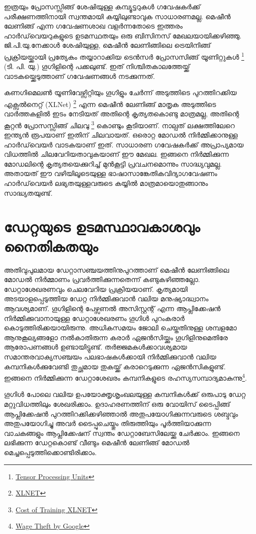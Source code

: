 \documentclass[12pt,twoside,a4paper]{article}
\begin{document}
ഇത്രയും പ്രോസസ്സിങ്ങ് ശേഷിയുള്ള കമ്പ്യൂട്ടറുകൾ ഗവേഷകർക്ക് പരീക്ഷണത്തിനായി സ്വന്തമായി കയ്യിലുണ്ടാവുക സാധാരണമല്ല. മെഷീൻ ലേണിങ്ങ് എന്ന ഗവേഷണശാഖ വളർന്നതോടെ ഇത്തരം ഹാർഡ്‌വെയറുകളുടെ ഉടമസ്ഥതയും ഒരു ബിസിനസ് മേഖലയായിക്കഴിഞ്ഞു. ജി.പി.യു.നേക്കാൾ ശേഷിയുള്ള, മെഷീൻ ലേണിങ്ങിലെ ട്രെയിനിങ്ങ് പ്രക്രിയയ്ക്കായി പ്രത്യേകം തയ്യാറാക്കിയ ടെൻസർ പ്രോസസിങ്ങ് യൂണിറ്റുകൾ \footnote{ \href{https://cloud.google.com/tpu/}{Tensor Processing Units} } (ടി. പി. യു.) ഗൂഗിളിന്റെ പക്കലുണ്ട്. ഇത് നിശ്ചിതകാലത്തേയ്ക്ക് വാടകയ്ക്കെടുത്താണ് ഗവേഷണങ്ങൾ നടക്കുന്നത്. 

കണഗിമെലൺ യൂണിവേഴ്സിറ്റിയും ഗൂഗിളും ചേർന്ന് അടുത്തിടെ പുറത്തിറക്കിയ എക്സൽനെറ്റ് (XLNet) \footnote{\href{https://medium.com/syncedreview/cmu-google-xlnet-tops-bert-achieves-sota-results-on-18-nlp-tasks-66f7022f34f5}{XLNET}} എന്ന മെഷീൻ ലേണിങ്ങ് മാതൃക അടുത്തിടെ വാർത്തകളിൽ ഇടം നേടിയത് അതിന്റെ കൃത്യതകൊണ്ടു മാത്രമല്ല, അതിന്റെ കൂറ്റൻ പ്രോസസ്സിങ്ങ്  ചിലവു \footnote{\href{https://medium.com/syncedreview/the-staggering-cost-of-training-sota-ai-models-e329e80fa82}{Cost of Training XLNET}} കൊണ്ടും കൂടിയാണ്. നാല്പത് ലക്ഷത്തിലേറെ ഇന്ത്യൻ രൂപയാണ് ഇതിന് ചിലവായത്. ഒരൊറ്റ മോഡൽ നിർമ്മിക്കാനുള്ള ഹാർഡ്‌വെയർ വാടകയാണ് ഇത്. സാധാരണ ഗവേഷകർക്ക് അപ്രാപ്യമായ വിധത്തിൽ ചിലവേറിയതാവുകയാണ് ഈ മേഖല. ഇങ്ങനെ നിർമ്മിക്കുന്ന മോഡലിന്റെ കൃത്യതയെക്കുറിച്ച് മുൻകൂട്ടി പ്രവചനമൊന്നും സാദ്ധ്യവുമല്ല. അതായത് ഈ വഴിയിലൂടെയുള്ള ഭാഷാസാങ്കേതികവിദ്യാഗവേഷണം ഹാർഡ്‌വെയർ ലഭ്യതയുള്ളവരുടെ കയ്യിൽ മാത്രമായൊതുങ്ങാനും സാദ്ധ്യതയുണ്ട്.


\section{ഡേറ്റയുടെ ഉടമസ്ഥാവകാശവും നൈതികതയും}

അതിവുപുലമായ ഡേറ്റാസഞ്ചയത്തിനുപുറത്താണ്  മെഷീൻ ലേണിങ്ങിലെ മോഡൽ നിർമ്മാണം പ്രവർത്തിക്കുന്നതെന്ന് കണ്ടുകഴിഞ്ഞല്ലോ. ഡേറ്റാശേഖരണവും ചെലവേറിയ പ്രക്രിയയാണ്. കൃത്യമായി അടയാളപ്പെടുത്തിയ ഡേറ്റ നിർമ്മിക്കുവാൻ വലിയ മനുഷ്യാദ്ധ്വാനം ആവശ്യമാണ്. ഗൂഗിളിന്റെ പേഴ്സണൽ അസിസ്റ്റന്റ് എന്ന ആപ്ലിക്കേഷൻ നിർമ്മിക്കുവാനായുള്ള ഡേറ്റാശേഖരണം ഗൂഗിൾ പുറംകരാർ കൊടുത്തിരിക്കയായിരുന്നു. അധികസമയം ജോലി ചെയ്തതിനുള്ള ശമ്പളമോ ആനുകൂല്യങ്ങളോ നൽകാതിരുന്ന കരാർ ഏജൻസിയ്ക്കും ഗൂഗിളിനുമെതിരേ ആരോപണങ്ങൾ ഉണ്ടായിട്ടുണ്ട്. തർജ്ജമകൾക്കാവശ്യമായ സമാന്തരവാക്യസഞ്ചയം പലഭാഷകൾക്കായി നിർമ്മിക്കുവാൻ  വലിയ കമ്പനികൾക്കുവേണ്ടി  തുച്ഛമായ തുകയ്ക്ക് കരാറെടുക്കുന്ന ഏജൻസികളുണ്ട്. ഇങ്ങനെ നിർമ്മിക്കുന്ന ഡേറ്റാശേഖരം കമ്പനികളുടെ രഹസ്യസമ്പാദ്യമാകുന്നു\footnote{\href{https://boingboing.net/2019/06/03/wage-theft-2.html}{Wage Theft by Google}}.

ഗൂഗിൾ പോലെ വലിയ ഉപയോക്തൃശൃംഖലയുള്ള‌ കമ്പനികൾക്ക് ഒരുപാടു ഡേറ്റ മറ്റുവിധത്തിലും ശേഖരിക്കാം. ഉദാഹരണത്തിന് ഒരു വോയിസ് ടൈപ്പിങ്ങ് ആപ്ലിക്കേഷൻ പുറത്തിറക്കിക്കഴിഞ്ഞാൽ അതുപയോഗിക്കുന്നവരുടെ ശബ്ദവും അതുപയോഗിച്ചു അവർ ടൈപ്പുചെയ്തും തിരുത്തിയും പൂർത്തിയാക്കുന്ന വാചകങ്ങളും ആപ്ലിക്കേഷന് സ്വന്തം ഡേറ്റാബേസിലേയ്ക്കു ചേർക്കാം. ഇങ്ങനെ ലഭിക്കുന്ന ഡേറ്റകൊണ്ട് വീണ്ടും മെഷീൻ ലേണിങ്ങ് മോഡൽ മെച്ചപ്പെടുത്തിക്കൊണ്ടിരിക്കാം.
\end{document}
